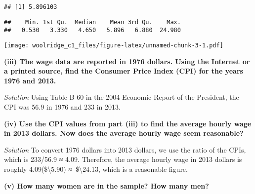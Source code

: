 \documentclass[
]{article}
\newenvironment{Shaded}{\begin{snugshade}}{\end{snugshade}}
\newcommand{\CommentTok}[1]{\textcolor[rgb]{0.56,0.35,0.01}{\textit{#1}}}
\newcommand{\KeywordTok}[1]{\textcolor[rgb]{0.13,0.29,0.53}{\textbf{#1}}}
\newcommand{\NormalTok}[1]{#1}
\newcommand{\OperatorTok}[1]{\textcolor[rgb]{0.81,0.36,0.00}{\textbf{#1}}}
\begin{document}
\begin{Shaded}
\end{Shaded}

\begin{verbatim}
## [1] 5.896103
\end{verbatim}

\begin{Shaded}
\end{Shaded}

\begin{verbatim}
##    Min. 1st Qu.  Median    Mean 3rd Qu.    Max. 
##   0.530   3.330   4.650   5.896   6.880  24.980
\end{verbatim}

\begin{Shaded}
\end{Shaded}

\texttt{[image: woolridge\_c1\_files/figure-latex/unnamed-chunk-3-1.pdf]}

\textbf{(iii) The wage data are reported in 1976 dollars. Using the
Internet or a printed source, find the Consumer Price Index (CPI) for
the years 1976 and 2013.}

\emph{Solution} Using Table B-60 in the 2004 Economic Report of the
President, the CPI was 56.9 in 1976 and 233 in 2013.

\textbf{(iv) Use the CPI values from part (iii) to find the average
hourly wage in 2013 dollars. Now does the average hourly wage seem
reasonable? }

\emph{Solution} To convert 1976 dollars into 2013 dollars, we use the
ratio of the CPIs, which is 233/56.9 ≈ 4.09. Therefore, the average
hourly wage in 2013 dollars is roughly 4.09(\$\textbackslash{}5.90)
≈~\$\textbackslash{}24.13, which is a reasonable figure.

\textbf{(v) How many women are in the sample? How many men?}
\end{document}
